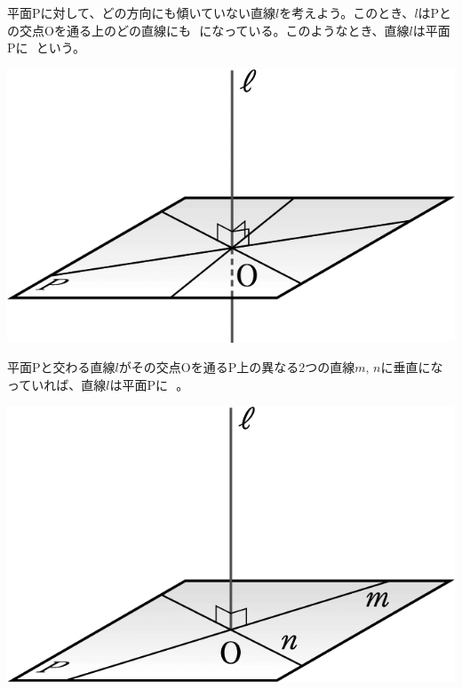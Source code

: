 \documentclass[
  12pt,a4paper,lualatex,ja=standard]{bxjsarticle}
\begin{document}
\begin{multicols}{2}

平面Pに対して、どの方向にも傾いていない直線$l$を考えよう。このとき、$l$はPとの交点Oを通る上のどの直線にも\,  \,になっている。このようなとき、直線$l$は平面Pに\,  \,という。

\columnbreak

\begin{center}
\includegraphics{media/image46.png}
\end{center}
\end{multicols}

\begin{multicols}{2}

平面Pと交わる直線$l$がその交点Oを通るP上の異なる2つの直線$m, \, n$に垂直になっていれば、直線$l$は平面Pに\,  \,。

\columnbreak

\begin{center}
\includegraphics{media/image49.png}
\end{center}
\end{multicols}
\end{document}
